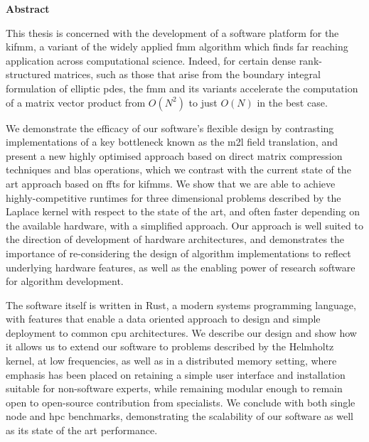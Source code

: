 \thispagestyle{plain}

\begin{center}
    \textbf{Abstract}
\end{center}

This thesis is concerned with the development of a software platform for the \acrfull{kifmm}, a variant of the widely applied \acrfull{fmm} algorithm which finds far reaching application across computational science. Indeed, for certain dense rank-structured matrices, such as those that arise from the boundary integral formulation of elliptic \glspl{pde}, the \acrshort{fmm} and its variants accelerate the computation of a matrix vector product from $O(N^2)$ to just $O(N)$ in the best case.

We demonstrate the efficacy of our software's flexible design by contrasting implementations of a key bottleneck known as the \acrfull{m2l} field translation, and present a new highly optimised approach based on direct matrix compression techniques and \acrshort{blas} operations, which we contrast with the current state of the art approach based on \glspl{fft} for \acrshort{kifmm}s. We show that we are able to achieve highly-competitive runtimes for three dimensional problems described by the Laplace kernel with respect to the state of the art, and often faster depending on the available hardware, with a simplified approach. Our approach is well suited to the direction of development of hardware architectures, and demonstrates the importance of re-considering the design of algorithm implementations to reflect underlying hardware features, as well as the enabling power of research software for algorithm development.

The software itself is written in Rust, a modern systems programming language, with features that enable a data oriented approach to design and simple deployment to common \acrshort{cpu} architectures. We describe our design and show how it allows us to extend our software to problems described by the  Helmholtz kernel, at low frequencies, as well as in a distributed memory setting, where emphasis has been placed on retaining a simple user interface and installation suitable for non-software experts, while remaining modular enough to remain open to open-source contribution from specialists. We conclude with both single node and \acrshort{hpc} benchmarks, demonstrating the scalability of our software as well as its state of the art performance.
